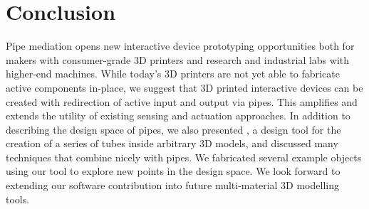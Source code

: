 \section{Conclusion}

Pipe mediation opens new interactive device prototyping opportunities both for makers with consumer-grade 3D printers and research and industrial labs with higher-end machines.  While today's 3D printers are not yet able to fabricate active components in-place, we suggest that 3D printed interactive devices can be created with redirection of active input and output via pipes.  This amplifies and extends the utility of existing sensing and actuation approaches.  In addition to describing the design space of pipes, we also presented \systemnamenospace, a design tool for the creation of a series of tubes \cite{series-of-tubes} inside arbitrary 3D models, and discussed many techniques that combine nicely with pipes.  We fabricated several example objects using our tool to explore new points in the design space.  We look forward to extending our software contribution into future multi-material 3D modelling tools.